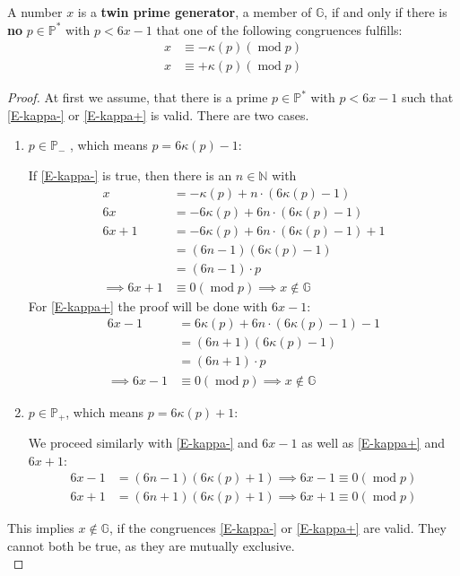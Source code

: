 \documentclass[10pt,a4paper]{amsart}
\newcommand{\G}{\mathbb{G}}
\newcommand{\M}[1]{\mathbb{#1}}
\newcommand{\mood}[1]{(\operatorname{mod} #1)}
\newcommand{\p}{\mathbb{P}}
\begin{document}
\begin{theorem}\label{T-twinprimegenerators}
A number $x$ is a \textbf{twin prime generator}, a member of $\G$, if and only if there is \textbf{no} $p \in \p^*$ with $p<6x-1$ that one of the following congruences fulfills:
\begin{align}
x &\equiv - \kappa(p)\mood{p} \label{E-kappa-}
\\
x &\equiv + \kappa(p)\mood{p} \label{E-kappa+}
\end{align}
\end{theorem}

\begin{proof}
At first we assume, that there is a prime $p\in\p^*$ with $p<6x-1$ such that \eqref{E-kappa-} or \eqref{E-kappa+} is valid. There are two cases.
\begin{enumerate}
\item{
$p \in \p_-$ , which means $p=6\kappa(p)-1$:

If \eqref{E-kappa-} is true, then there is an $n \in \M{N}$ with
\begin{align*}
x &= -\kappa(p)+n \cdot (6\kappa(p)-1)\\
6x &= -6\kappa(p)+6n \cdot (6\kappa(p)-1)\\ 
6x+1 &=-6\kappa(p)+6n \cdot (6\kappa(p)-1)+1\\
&=(6n-1)(6\kappa(p)-1)\\
&=(6n-1)\cdot p\\
\implies 6x+1 &\equiv 0 \mood{p} \implies x \notin \G
\end{align*}
For \eqref{E-kappa+} the proof will be done with $6x-1$:
\begin{align*}
6x-1 &=6\kappa(p)+6n \cdot (6\kappa(p)-1)-1\\
&=(6n+1)(6\kappa(p)-1)\\
&=(6n+1)\cdot p\\
\implies 6x-1 &\equiv 0 \mood{p} \implies x \notin \G
\end{align*}
}
\item{
$p \in \p_+$, which means $p=6\kappa(p)+1$:

We proceed similarly with \eqref{E-kappa-} and $6x-1$ as well as \eqref{E-kappa+} and $6x+1$:
\begin{align*}
6x-1 &=(6n-1)(6\kappa(p)+1) \implies 6x-1 \equiv 0 \mood{p}\\
6x+1 &=(6n+1)(6\kappa(p)+1) \implies 6x+1 \equiv 0 \mood{p}
\end{align*}
}
\end{enumerate}
This implies $x \notin \G$, if the congruences \eqref{E-kappa-} or \eqref{E-kappa+} are valid. They cannot both be true, as they are mutually exclusive. \\


\end{proof}
\end{document}
